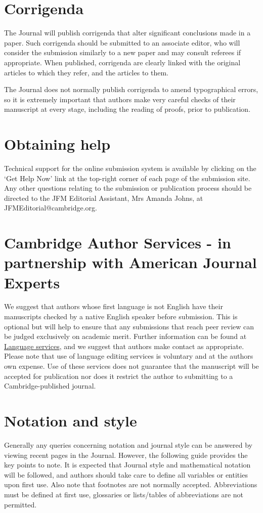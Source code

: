 \documentclass[lineno]{jfm}
\begin{document}
\section{Corrigenda}
 The Journal will publish corrigenda that alter significant conclusions made in a paper.  Such corrigenda should be submitted to an associate editor, who will consider the submission similarly to a new paper and may consult referees if appropriate.  When published, corrigenda are clearly linked with the original articles to which they refer, and the articles to them.

\indent The Journal does not normally publish corrigenda to amend typographical errors, so it is extremely important that authors make very careful checks of their manuscript at every stage, including the reading of proofs, prior to publication.



\section{Obtaining help}
 Technical support for the online submission system is available by clicking on the `Get Help Now' link at the top-right corner of each page of the submission site. Any other questions relating to the submission or publication process should be directed to the JFM Editorial Assistant, Mrs Amanda Johns, at JFMEditorial@cambridge.org.

\section{Cambridge Author Services - in partnership with American Journal Experts}
 We suggest that authors whose first language is not English have their manuscripts checked by a native English speaker before submission. This is optional but will help to ensure that any submissions that reach peer review can be judged exclusively on academic merit. Further information can be found at \href{https://www.cambridge.org/core/services/authors/language-services} {Language services}, and we suggest that authors make contact as appropriate. Please note that use of language editing services is voluntary and at the author\textquotesingle s own expense. Use of these services does not guarantee that the manuscript will be accepted for publication nor does it restrict the author to submitting to a Cambridge-published journal.

\section{Notation and style}\label{notstyle}
 Generally any queries concerning notation and journal style can be answered by viewing recent pages in the Journal. However, the following guide provides the key points to note. It is expected that Journal style and mathematical notation will be followed, and authors should take care to define all variables or entities upon first use. Also note that footnotes are not normally accepted.  Abbreviations must be defined at first use, glossaries or lists/tables of abbreviations are not permitted.
\end{document}
